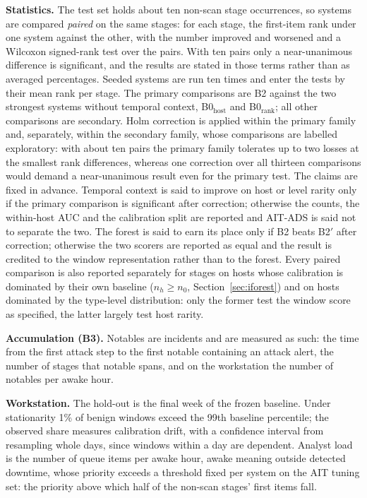 \documentclass[conference]{IEEEtran}
\begin{document}
\textbf{Statistics.} The test set holds about ten non-scan stage occurrences, so systems are compared \emph{paired} on the same stages: for each stage, the first-item rank under one system against the other, with the number improved and worsened and a Wilcoxon signed-rank test over the pairs. With ten pairs only a near-unanimous difference is significant, and the results are stated in those terms rather than as averaged percentages. Seeded systems are run ten times and enter the tests by their mean rank per stage. The primary comparisons are B2 against the two strongest systems without temporal context, B0$_\mathrm{host}$ and B0$_\mathrm{rank}$; all other comparisons are secondary. Holm correction is applied within the primary family and, separately, within the secondary family, whose comparisons are labelled exploratory: with about ten pairs the primary family tolerates up to two losses at the smallest rank differences, whereas one correction over all thirteen comparisons would demand a near-unanimous result even for the primary test. The claims are fixed in advance. Temporal context is said to improve on host or level rarity only if the primary comparison is significant after correction; otherwise the counts, the within-host AUC and the calibration split are reported and AIT-ADS is said not to separate the two. The forest is said to earn its place only if B2 beats B2$'$ after correction; otherwise the two scorers are reported as equal and the result is credited to the window representation rather than to the forest. Every paired comparison is also reported separately for stages on hosts whose calibration is dominated by their own baseline ($n_h \ge n_0$, Section~\ref{sec:iforest}) and on hosts dominated by the type-level distribution: only the former test the window score as specified, the latter largely test host rarity.

\textbf{Accumulation (B3).} Notables are incidents and are measured as such: the time from the first attack step to the first notable containing an attack alert, the number of stages that notable spans, and on the workstation the number of notables per awake hour.

\textbf{Workstation.} The hold-out is the final week of the frozen baseline. Under stationarity 1\% of benign windows exceed the 99th baseline percentile; the observed share measures calibration drift, with a confidence interval from resampling whole days, since windows within a day are dependent. Analyst load is the number of queue items per awake hour, awake meaning outside detected downtime, whose priority exceeds a threshold fixed per system on the AIT tuning set: the priority above which half of the non-scan stages' first items fall.
\end{document}
